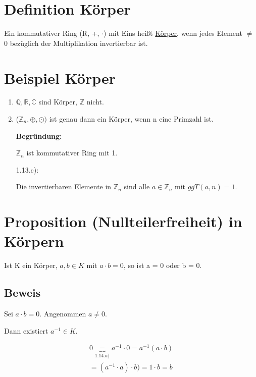 \documentclass[a4paper, openany]{book}
\begin{document}
  \section{Definition Körper}

  Ein kommutativer Ring (R, +, $\cdot$) mit Eins heißt \underline{Körper}, wenn jedes Element $\neq$ 0 bezüglich der Multiplikation invertierbar ist.

  \section{Beispiel Körper}

  \begin{enumerate}[label=(\alph*)]
    \item $\mathbb{Q}, \mathbb{R}, \mathbb{C}$ sind Körper, $\mathbb{Z}$ nicht.
    \item ($\mathbb{Z}_n, \oplus, \odot)$ ist genau dann ein Körper, wenn n eine Primzahl ist.

    \textbf{Begründung:} 

    $\mathbb{Z}_n$ ist kommutativer Ring mit 1.

    1.13.c): 

    Die invertierbaren Elemente in $\mathbb{Z}_n$ sind alle $a \in \mathbb{Z}_n$ mit $ggT(a,n) = 1$.
  \end{enumerate}

  \section{Proposition (Nullteilerfreiheit) in Körpern}

  Ist K ein Körper, $a,b \in K$ mit $a \cdot b = 0$, so ist a = 0 oder b = 0.

  \subsection{Beweis}

  Sei $a \cdot b = 0$. Angenommen $a \neq 0$.

  Dann existiert $a^{-1} \in K$.

  \begin{equation}
    \begin{split}
      0 \underbrace{=}_{1.14.a)} a^{-1} \cdot 0 = a^{-1} (a \cdot b) \\
      = (a^{-1} \cdot a) \cdot b) = 1 \cdot b = b
    \end{split}
  \end{equation}
\end{document}
